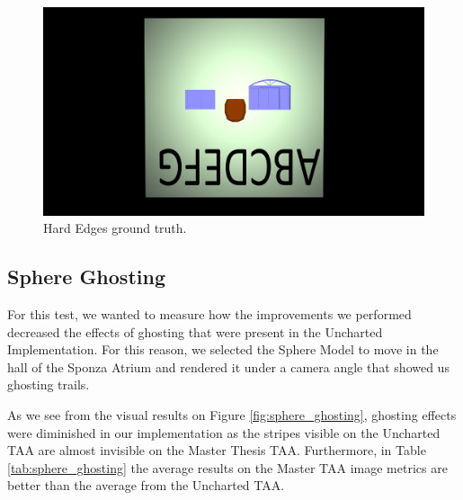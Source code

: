 \documentclass{cslthse-msc}
\begin{document}
\begin{figure}[H]
	\centering
	\includegraphics[scale=0.09]{images/results/hard_test_sobel_ground_truth.png}
	\caption{Hard Edges ground truth.}\label{fig:hard_test_truth}
\end{figure}


\subsection{Sphere Ghosting}
For this test, we wanted to measure how the improvements we performed decreased the effects of ghosting that were present in the Uncharted Implementation. For this reason, we selected the Sphere Model to move in the hall of the Sponza Atrium and rendered it under a camera angle that showed us ghosting trails. 

As we see from the visual results on Figure \ref{fig:sphere_ghosting}, ghosting effects were diminished in our implementation as the stripes visible on the Uncharted TAA are almost invisible on the Master Thesis TAA. Furthermore, in Table \ref{tab:sphere_ghosting} the average results on the Master TAA image metrics are better than the average from the Uncharted TAA. 
\end{document}
